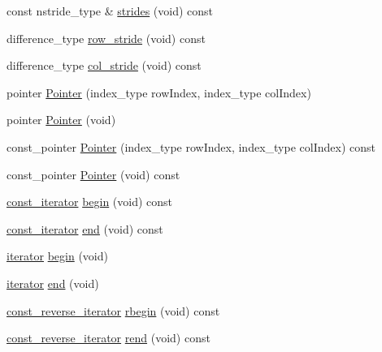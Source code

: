 \begin{DoxyCompactItemize}
\item 
const nstride\+\_\+type \& \hyperlink{classvct_dynamic_matrix_owner_a5d51db98e98175fadef6c0abbd6f7cbc}{strides} (void) const 
\item 
difference\+\_\+type \hyperlink{classvct_dynamic_matrix_owner_ab36acf0781fab37716ac2b9a9b597438}{row\+\_\+stride} (void) const 
\item 
difference\+\_\+type \hyperlink{classvct_dynamic_matrix_owner_a0b2b4b9cc113e9d566156dd397a8454e}{col\+\_\+stride} (void) const 
\item 
pointer \hyperlink{classvct_dynamic_matrix_owner_a3798759a1e6b1d5f478ffa2f204a52f6}{Pointer} (index\+\_\+type row\+Index, index\+\_\+type col\+Index)
\item 
pointer \hyperlink{classvct_dynamic_matrix_owner_a573e0c3cd3170ee877fe15bc7f2f01b0}{Pointer} (void)
\item 
const\+\_\+pointer \hyperlink{classvct_dynamic_matrix_owner_a214ebb77719384052a09bb98971fe360}{Pointer} (index\+\_\+type row\+Index, index\+\_\+type col\+Index) const 
\item 
const\+\_\+pointer \hyperlink{classvct_dynamic_matrix_owner_ad9c8a147bff9542751ae1caf287b8775}{Pointer} (void) const 
\item 
\hyperlink{classvct_dynamic_matrix_owner_ac83fab5858a222a2debcf2059c9f06e2}{const\+\_\+iterator} \hyperlink{classvct_dynamic_matrix_owner_a895a2692a9541c359af85c5c7a6f03c6}{begin} (void) const 
\item 
\hyperlink{classvct_dynamic_matrix_owner_ac83fab5858a222a2debcf2059c9f06e2}{const\+\_\+iterator} \hyperlink{classvct_dynamic_matrix_owner_a950149b64ccadd49c0eb30c237e79b4e}{end} (void) const 
\item 
\hyperlink{classvct_dynamic_matrix_owner_aa723836eb06a7ae230e80ec85a44e059}{iterator} \hyperlink{classvct_dynamic_matrix_owner_a2aabf6efb212452edbdfb406901d333d}{begin} (void)
\item 
\hyperlink{classvct_dynamic_matrix_owner_aa723836eb06a7ae230e80ec85a44e059}{iterator} \hyperlink{classvct_dynamic_matrix_owner_ad1cf9fe2bdd77bcd3608302d69b1a415}{end} (void)
\item 
\hyperlink{classvct_dynamic_matrix_owner_a3f5a649a5285f9909e4628151d9cdac1}{const\+\_\+reverse\+\_\+iterator} \hyperlink{classvct_dynamic_matrix_owner_a03a22a79b7df7aba41e15490dde8202f}{rbegin} (void) const 
\item 
\hyperlink{classvct_dynamic_matrix_owner_a3f5a649a5285f9909e4628151d9cdac1}{const\+\_\+reverse\+\_\+iterator} \hyperlink{classvct_dynamic_matrix_owner_a8b1e8e411a8ab85eebfe4b1b0a1df797}{rend} (void) const 

\end{DoxyCompactItemize}
